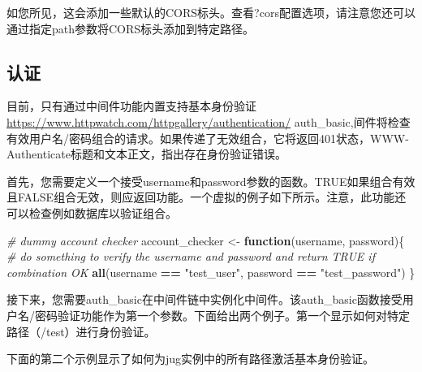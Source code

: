 \documentclass[]{book}
\newenvironment{Shaded}{\begin{snugshade}}{\end{snugshade}}
\newcommand{\KeywordTok}[1]{\textcolor[rgb]{0.13,0.29,0.53}{\textbf{#1}}}
\newcommand{\StringTok}[1]{\textcolor[rgb]{0.31,0.60,0.02}{#1}}
\newcommand{\CommentTok}[1]{\textcolor[rgb]{0.56,0.35,0.01}{\textit{#1}}}
\newcommand{\ControlFlowTok}[1]{\textcolor[rgb]{0.13,0.29,0.53}{\textbf{#1}}}
\newcommand{\OperatorTok}[1]{\textcolor[rgb]{0.81,0.36,0.00}{\textbf{#1}}}
\newcommand{\NormalTok}[1]{#1}
\begin{document}
如您所见，这会添加一些默认的CORS标头。查看?cors配置选项，请注意您还可以通过指定path参数将CORS标头添加到特定路径。

\subsection{认证}

目前，只有通过中间件功能内置支持基本身份验证\url{https://www.httpwatch.com/httpgallery/authentication/}
auth\_basic,间件将检查有效用户名/密码组合的请求。如果传递了无效组合，它将返回401状态，WWW-Authenticate标题和文本正文，指出存在身份验证错误。

首先，您需要定义一个接受username和password参数的函数。TRUE如果组合有效且FALSE组合无效，则应返回功能。一个虚拟的例子如下所示。注意，此功能还可以检查例如数据库以验证组合。

\begin{Shaded}
\begin{Highlighting}[]
\CommentTok{# dummy account checker}
\NormalTok{account_checker <-}\StringTok{ }\ControlFlowTok{function}\NormalTok{(username, password)\{}
  \CommentTok{# do something to verify the username and password and return TRUE if combination OK}
  \KeywordTok{all}\NormalTok{(username }\OperatorTok{==}\StringTok{ "test_user"}\NormalTok{, }
\NormalTok{      password }\OperatorTok{==}\StringTok{ "test_password"}\NormalTok{)}
\NormalTok{\}}
\end{Highlighting}
\end{Shaded}

接下来，您需要auth\_basic在中间件链中实例化中间件。该auth\_basic函数接受用户名/密码验证功能作为第一个参数。下面给出两个例子。第一个显示如何对特定路径（/test）进行身份验证。

\begin{Shaded}
\end{Shaded}

下面的第二个示例显示了如何为jug实例中的所有路径激活基本身份验证。
\end{document}
